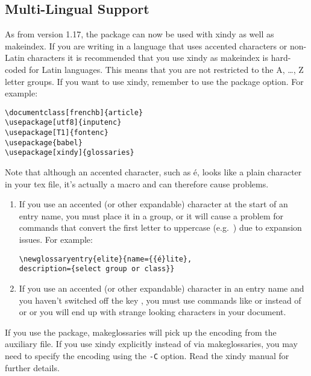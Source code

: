 \documentclass{nlctdoc}
\let\glsation\glsuserii
\newcommand*{\gloskey}[2][newglossaryentry]{\csopt{#1}{#2}}
\begin{document}
\subsection{Multi-Lingual Support}
\label{sec:languages}

As from version 1.17, the  package can now be
used with \gls{xindy} as well as \gls{makeindex}. If you
are writing in a language that uses accented characters or
non-Latin characters it is recommended that you use \gls*{xindy}
as \gls*{makeindex} is hard-coded for Latin languages. This
means that you are not restricted to the A, \ldots, Z letter groups.
If you want to use \gls*{xindy}, remember to use the
 package option. For example:
\begin{verbatim}
\documentclass[frenchb]{article}
\usepackage[utf8]{inputenc}
\usepackage[T1]{fontenc}
\usepackage{babel}
\usepackage[xindy]{glossaries}
\end{verbatim}

\begin{important}
Note that although an accented character, such as é, looks like a plain
character in your tex file, it's actually a macro and can therefore
cause problems.

\begin{enumerate}
\item
If you use an accented (or other expandable) character at the start of
an entry name, you must place it in a group, or it will cause
a problem for commands that convert the first letter to uppercase
(e.g.\ ) due to expansion issues. For example:
\begin{verbatim}
\newglossaryentry{elite}{name={{é}lite},
description={select group or class}}
\end{verbatim}

\item If you use an accented (or other expandable) character in an
entry name and you haven't switched off the \gloskey{name} key
\glsation{sanitize}, you must use commands like
 or  instead of  or
 or you will end up with strange looking characters in
your document.

\end{enumerate}
\end{important}

If you use the  package, \gls{makeglossaries}
will pick up the encoding from the auxiliary file. If you use
\gls{xindy} explicitly instead of via \gls*{makeglossaries},
you may need to specify the encoding using the \texttt{-C} 
option. Read the \gls*{xindy} manual for further details.
\end{document}
